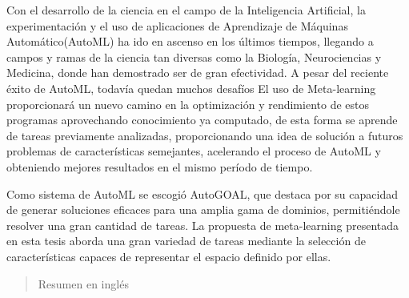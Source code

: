 \begin{resumen}
	Con el desarrollo de la ciencia en el campo de la Inteligencia Artificial,
	la experimentación y el uso de aplicaciones de Aprendizaje de Máquinas
	Automático(AutoML) ha ido en ascenso en los últimos tiempos, llegando a
	campos y ramas de la ciencia tan diversas como la Biología, Neurociencias y
	Medicina, donde han demostrado ser de gran efectividad. A pesar del
	reciente éxito de AutoML, todavía quedan muchos desafíos El uso de
	Meta-learning proporcionará un nuevo camino en la optimización y
	rendimiento de estos programas aprovechando conocimiento ya computado, de
	esta forma se aprende de tareas previamente analizadas, proporcionando una
	idea de solución a futuros	problemas de características semejantes,
	acelerando el proceso de AutoML y obteniendo mejores resultados en el mismo
	período de tiempo. 

	Como sistema de AutoML se escogió AutoGOAL, que destaca por su capacidad de
	generar soluciones eficaces para una amplia gama de dominios, permitiéndole
	resolver una gran cantidad de tareas. La propuesta de meta-learning
	presentada en esta tesis aborda una gran variedad de tareas mediante la
	selección de características capaces de representar el espacio definido por
	ellas.
\end{resumen}

\begin{abstract}
	Resumen en inglés
\end{abstract}